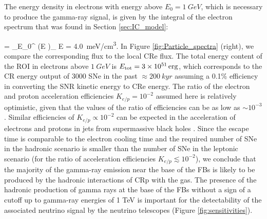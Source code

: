 The energy density in electrons with energy above $E_0 = \SI{1}{GeV}$, which is necessary to produce the gamma-ray signal, 
is given by the integral of the electron spectrum that was found in Section \ref{sec:IC_model}:

\be
{} = \int_{E_0}^{\infty} \left(E \right)_{\!\!\el} \de E = \SI{4.0}{meV/cm^3}.
\ee
In Figure \ref{fig:Particle_spectra} (right), we compare the corresponding flux to the local CRe flux.
The total energy content of the ROI in electrons above $\SI{1}{GeV}$ is $E_{\text{tot}} = \SI{3e51}{erg}$, which corresponds to the CR energy output of 3000 SNe in the past $\approx \SI{200}{kyr}$ assuming a 0.1\% efficiency in converting the SNR kinetic energy to CRe energy.
The ratio of the electron and proton acceleration efficiencies $K_{e/p} = 10^{-2}$ assumed here is relatively optimistic,
given that the values of the ratio of efficiencies can be as low as $\sim 10^{-3}$ \citep[e.g.,][]{2015PhRvL.114h5003P}.
Similar efficiencies of $K_{e/p} \propto 10^{-2}$ can be expected in the acceleration of 
electrons and protons in jets from supermassive black holes \citep[e.g.,][]{2018arXiv180305556B}.
Since the escape time is comparable to the electron cooling time and the required number of SNe in the hadronic
scenario is smaller than the number of SNe in the leptonic scenario (for the ratio of acceleration efficiencies $K_{e/p} \lesssim 10^{-2}$),
we conclude that the majority of the gamma-ray emission near the base of the FBs 
is likely to be produced by the hadronic interactions of CRp with the gas.
The presence of the hadronic production of gamma rays at the base of the FBs without a sign of a cutoff up to gamma-ray energies
of 1 TeV is important for the detectability of the associated neutrino signal by the neutrino telescopes (Figure \ref{fig:sensitivities}).

